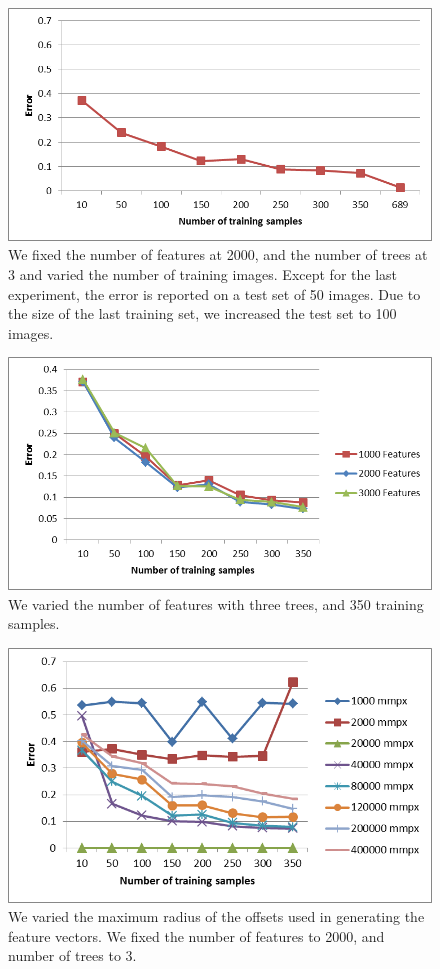 \begin{figure}
\begin{center}
\includegraphics[width=0.45 \textwidth]{fig/largetraining.png}
\end{center}
\caption{We fixed the number of features at 2000, and the number of trees at 3 and varied the number of training images. Except for the last experiment, the error is reported on a test set of 50 images. Due to the size of the last training set, we increased the test set to 100 images.}
\label{fig:largetraining}
\end{figure}

\begin{figure}
\begin{center}
\includegraphics[width=0.45 \textwidth]{fig/varyfeatures.png}
\end{center}
\caption{We varied the number of features with three trees, and 350 training samples.}
\label{fig:varyfeatures}
\end{figure}


\begin{figure}
\begin{center}
\includegraphics[width=0.45 \textwidth]{fig/varyradii.png}
\end{center}
\caption{We varied the maximum radius of the offsets used in generating the feature vectors. We fixed the number of features to 2000, and number of trees to 3.}
\label{fig:varyradii}
\end{figure}

